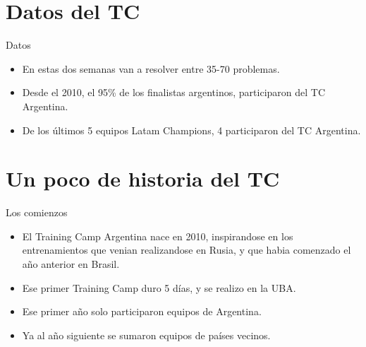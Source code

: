 \documentclass{beamer}
\begin{document}
\section{Datos del TC}
\begin{frame}{Datos}
    \begin{itemize}
        \item En estas dos semanas van a resolver entre 35-70 problemas.
        \item Desde el 2010, el 95\% de los finalistas argentinos, participaron del TC Argentina.
        \item De los últimos 5 equipos Latam Champions, 4 participaron del TC Argentina.
    \end{itemize}
\end{frame}

\section{Un poco de historia del TC}

\begin{frame}{Los comienzos}
    
    \begin{itemize}
        \item El Training Camp Argentina nace en 2010, inspirandose en los entrenamientos que venian realizandose en Rusia, y que habia comenzado el año anterior en Brasil.
        \item Ese primer Training Camp duro 5 días, y se realizo en la UBA.
        \item Ese primer año solo participaron equipos de Argentina.
        \item Ya al año siguiente se sumaron equipos de países vecinos.
    \end{itemize}
\end{frame}
\end{document}
